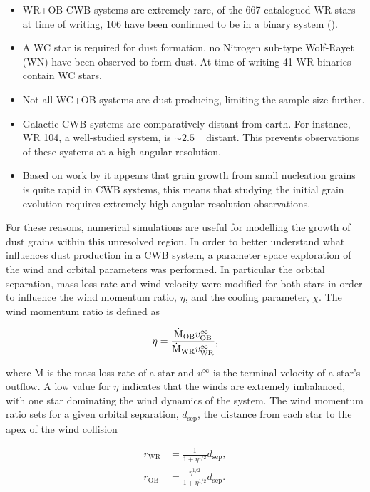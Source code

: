 \documentclass[fleqn,usenatbib]{mnras}
\begin{document}
\begin{itemize}
  \item WR+OB CWB systems are extremely rare, of the 667 catalogued WR stars at time of writing, 106 have been confirmed to be in a binary system (\cite{rossloweSpatialDistributionGalactic2015}).
  \item A WC star is required for dust formation, no Nitrogen sub-type Wolf-Rayet (WN) have been observed to form dust. At time of writing 41 WR binaries contain WC stars.
  \item Not all WC+OB systems are dust producing, limiting the sample size further.
  \item Galactic CWB systems are comparatively distant from earth. For instance, WR 104, a well-studied system, is $\sim 2.5$ \si{\kilo\parsec} distant. This prevents observations of these systems at a high angular resolution.
  \item Based on work by \cite{zubkoPhysicalModelDust1998a} it appears that grain growth from small nucleation grains is quite rapid in CWB systems, this means that studying the initial grain evolution requires extremely high angular resolution observations.
\end{itemize}

For these reasons, numerical simulations are useful for modelling the growth of dust grains within this unresolved region.
In order to better understand what influences dust production in a CWB system, a parameter space exploration of the wind and orbital parameters was performed.
In particular the orbital separation, mass-loss rate and wind velocity were modified for both stars in order to influence the wind momentum ratio, $\eta$, and the cooling parameter, $\chi$.
The wind momentum ratio is defined as

\begin{equation}
  \eta = \frac{\dot{\text M}_\text{OB} v^\infty_\text{OB}}{\dot{\text M}_\text{WR}v^\infty_\text{WR}} ,
\end{equation}

\noindent
where $\dot{\text{M}}$ is the mass loss rate of a star and $v^\infty$ is the terminal velocity of a star's outflow.
A low value for $\eta$ indicates that the winds are extremely imbalanced, with one star dominating the wind dynamics of the system.
The wind momentum ratio sets for a given orbital separation, $d_\text{sep}$, the distance from each star to the apex of the wind collision

\begin{subequations}
  \begin{align}
    r_\text{WR} & = \frac{1}{1+\eta^{1/2}} d_\text{sep} , \\
    r_\text{OB} & = \frac{\eta^{1/2}}{1+\eta^{1/2}} d_\text{sep} .
  \end{align}
\end{subequations}
\end{document}
